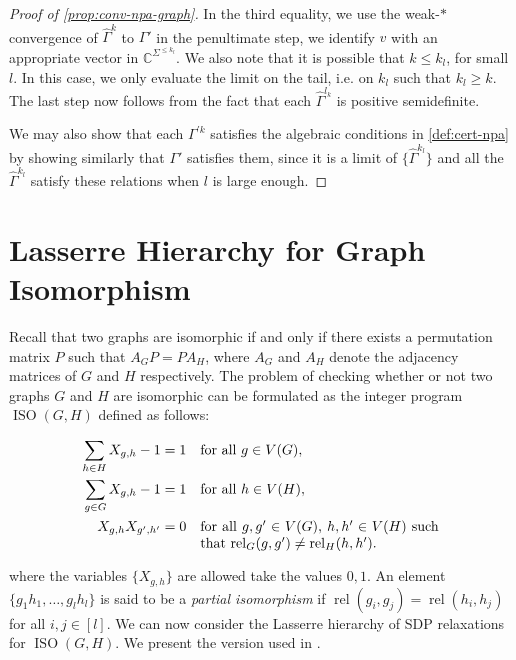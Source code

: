 \documentclass[11pt,a4paper]{article}
\theoremstyle{plain}
\theoremstyle{remark}
\theoremstyle{definition}
\DeclareMathOperator{\rel}{rel}
\DeclareMathOperator{\iso}{ISO}
\begin{document}
\begin{proof}[Proof of \ref{prop:conv-npa-graph}]
    In the third equality, we use the weak-$*$ convergence of $\widehat{\Gamma}^k$ to $\Gamma'$ in the penultimate step, we identify $v$ with an appropriate vector in $\mathbb{C}^{\Sigma^{\leq k_l}}$. We also note that it is possible that $k \leq k_l$, for small $l$. In this case, we only evaluate the limit on the tail, i.e. on $k_l$ such that $k_l \geq k$. The last step now follows from the fact that each $\widehat{\Gamma}^{l_k}$ is positive semidefinite.

    We may also show that each $\Gamma^{'k}$ satisfies the algebraic conditions in \cref{def:cert-npa} by showing similarly that $\Gamma'$ satisfies them, since it is a limit of $\{\widehat{\Gamma}^{k_l}\}$ and all the $\widehat{\Gamma}^{k_l}$ satisfy these relations when $l$ is large enough. 
\end{proof}

\section{Lasserre Hierarchy for Graph Isomorphism}\label{sec:lasserre}

Recall that two graphs are isomorphic if and only if there exists a permutation matrix $P$ such that $A_G P = P A_H$, where $A_G$ and $A_H$ denote the adjacency matrices of $G$ and $H$ respectively. The problem of checking whether or not two graphs $G$ and $H$ are isomorphic can be formulated as the integer program $\iso(G,H)$ defined as follows: 

\begin{align}
    \begin{aligned}
        \sum_{h \in H} X_{g,h} - 1 & = 1 && \text{for all } g\in V(G), \\
        \sum_{g \in G} X_{g,h} - 1 & = 1 && \text{for all } h\in V(H), \\
        X_{g,h}X_{g',h'} & = 0 && \parbox[t]{6cm}{for all $g,g' \in V(G)$, $h,h' \in V(H)$  such that $\rel_G(g,g') \neq \rel_H(h,h')$.}
    \end{aligned}
\end{align}

where the variables $\{X_{g,h}\}$ are allowed take the values $0,1$. An element $\{g_1h_1, \dots , g_lh_l\}$ is said to be a \emph{partial isomorphism} if $\rel(g_i, g_j) = \rel(h_i, h_j)$ for all $i, j \in [l]$.  We can now consider the Lasserre hierarchy of SDP relaxations for $\iso(G,H)$. We present the version used in \cite{roberson-seppelt-arxiv}. 
\end{document}
